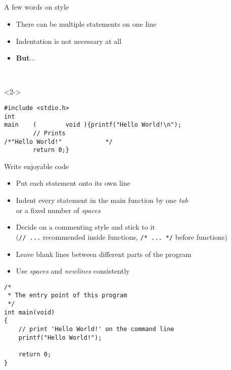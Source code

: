 \subsection{}
\begin{frame}[fragile]{A few words on style}
	\begin{itemize}
		\item There can be multiple statements on one line
		\item Indentation is not necessary at all
		\item<2-> \textbf{But}...
	\end{itemize}
	\ \\
	\begin{uncoverenv}<2->
	\begin{lstlisting}
#include <stdio.h>
int
main	(        void ){printf("Hello World!\n");
		// Prints
/*"Hello World!"			*/
		return 0;}
\end{lstlisting}
	\end{uncoverenv}
\end{frame}
\begin{frame}[fragile]{Write enjoyable code}
	\begin{itemize}
		\item Put each statement onto its own line
		\item Indent every statement in the main function by one \textit{tab}\\
		 or a fixed number of \textit{spaces}
		\item Decide on a commenting style and stick to it\\
		(\lstinline{// ...} recommended inside functions, \lstinline{/* ... */} before functions)
		\item Leave blank lines between different parts of the program
		\item Use \textit{spaces} and \textit{newlines} consistently
	\end{itemize}
	\begin{lstlisting}
/*
 * The entry point of this program
 */
int main(void)
{
	// print 'Hello World!' on the command line
	printf("Hello World!");

	return 0;
}
\end{lstlisting}
\end{frame}



